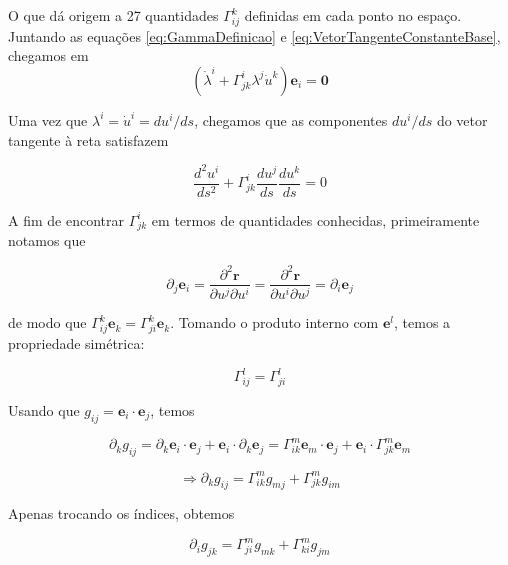 O que dá origem a 27 quantidades $ \Gamma_{i j}^{k} $ definidas em cada ponto no espaço. Juntando as equações \ref{eq:GammaDefinicao} e \ref{eq:VetorTangenteConstanteBase}, chegamos em
\begin{equation}\label{eq:CoordenadasLambdaE}
	\left(\dot{\lambda}^{i}+\Gamma_{j k}^{i} \lambda^{j} \dot{u}^{k}\right) \mathbf{e}_{i}=\mathbf{0}
\end{equation}

Uma vez que $ \lambda^{i}=\dot{u}^{i}=d u^{i} / d s $, chegamos que as componentes $ d u^{i} / d s $ do vetor tangente à reta satisfazem

\begin{equation}\label{eq:ComponentesUGamma}
\frac{d^{2} u^{i}}{d s^{2}}+\Gamma_{j k}^{i} \frac{d u^{j}}{d s} \frac{d u^{k}}{d s}=0
\end{equation} 

A fim de encontrar $ \Gamma_{j k}^{i} $ em termos de quantidades conhecidas, primeiramente notamos que

\[
\partial_{j} \mathbf{e}_{i}=\frac{\partial^{2} \mathbf{r}}{\partial u^{j} \partial u^{i}}=\frac{\partial^{2} \mathbf{r}}{\partial u^{i} \partial u^{j}}=\partial_{i} \mathbf{e}_{j}
\]

de modo que $ \Gamma_{i j}^{k} \mathbf{e}_{k}=\Gamma_{j i}^{k} \mathbf{e}_{k} $. Tomando o produto interno com $ \mathbf{e}^{l} $, temos a propriedade simétrica:


\begin{equation}\label{eq:GammaSimetria}
\boxed{\Gamma_{i j}^{l}=\Gamma_{j i}^{l}}
\end{equation}

Usando que $ g_{i j}=\mathbf{e}_{i} \cdot \mathbf{e}_{j} $, temos

\[
\partial_{k} g_{i j}=\partial_{k} \mathbf{e}_{i} \cdot \mathbf{e}_{j}+\mathbf{e}_{i} \cdot \partial_{k} \mathbf{e}_{j}=\Gamma_{i k}^{m} \mathbf{e}_{m} \cdot \mathbf{e}_{j}+\mathbf{e}_{i} \cdot \Gamma_{j k}^{m} \mathbf{e}_{m}
\]


\begin{equation}\label{eq:deltak}
\Rightarrow \partial_{k} g_{i j}=\Gamma_{i k}^{m} g_{m j}+\Gamma_{j k}^{m} g_{i m}
\end{equation}

Apenas trocando os índices, obtemos

\begin{equation}\label{eq:deltai}
\partial_{i} g_{j k}=\Gamma_{j i}^{m} g_{m k}+\Gamma_{k i}^{m} g_{j m}
\end{equation}

